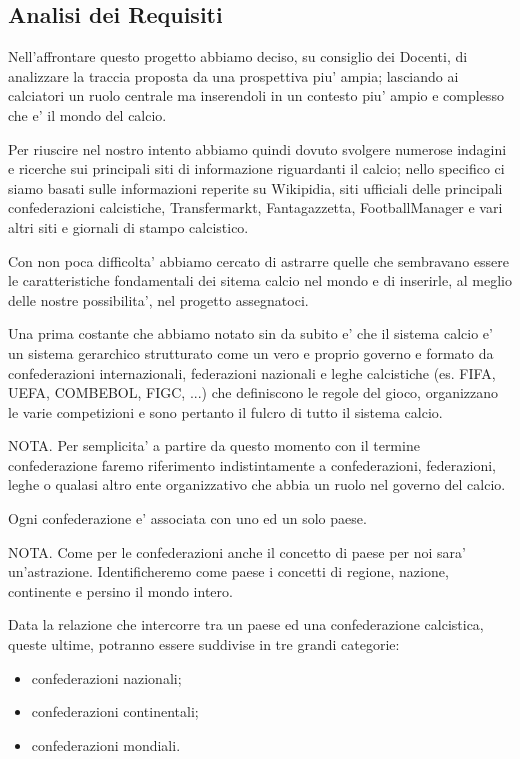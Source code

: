 \newpage
\subsection{\Large Analisi dei Requisiti}

Nell'affrontare questo progetto abbiamo deciso, su consiglio dei Docenti, di analizzare
la traccia proposta da una prospettiva piu' ampia; lasciando ai calciatori un ruolo centrale
ma inserendoli in un contesto piu' ampio e complesso che e' il mondo del calcio.

Per riuscire nel nostro intento abbiamo quindi dovuto svolgere numerose indagini e ricerche
sui principali siti di informazione riguardanti il calcio; nello specifico ci siamo basati sulle
informazioni reperite su Wikipidia, siti ufficiali delle principali confederazioni calcistiche,
Transfermarkt, Fantagazzetta, FootballManager e vari altri siti e giornali di stampo calcistico.

Con non poca difficolta' abbiamo cercato di astrarre quelle che sembravano essere le
caratteristiche fondamentali dei sitema calcio nel mondo e di inserirle, al meglio delle nostre
possibilita', nel progetto assegnatoci.

Una prima costante che abbiamo notato sin da subito e' che il sistema calcio e' un sistema
gerarchico strutturato come un vero e proprio governo e formato da confederazioni internazionali,
federazioni nazionali e leghe calcistiche (es. FIFA, UEFA, COMBEBOL, FIGC, ...) che definiscono
le regole del gioco, organizzano le varie competizioni e sono pertanto il fulcro di
tutto il sistema calcio.

NOTA. Per semplicita' a partire da questo momento con il termine confederazione faremo
riferimento indistintamente a confederazioni, federazioni, leghe o qualasi altro ente
organizzativo che abbia un ruolo nel governo del calcio.

Ogni confederazione e' associata con uno ed un solo paese.

NOTA. Come per le confederazioni anche il concetto di paese per noi sara' un'astrazione.
Identificheremo come paese i concetti di regione, nazione, continente e persino il mondo intero.

Data la relazione che intercorre tra un paese ed una confederazione calcistica, queste ultime,
potranno essere suddivise in tre grandi categorie:
\begin{itemize}
	\item confederazioni nazionali;
	\item confederazioni continentali;
	\item confederazioni mondiali.
\end{itemize}

